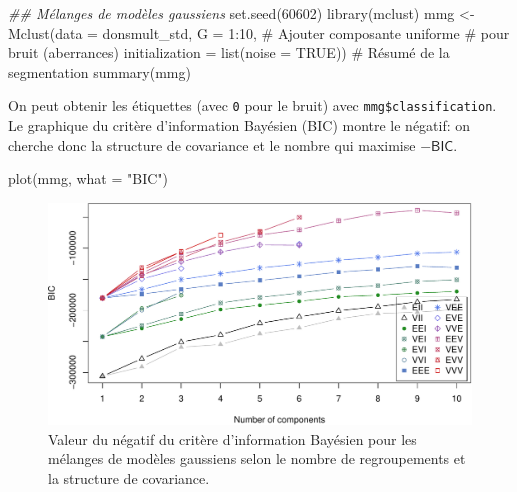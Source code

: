 \documentclass[
  11pt,
  letterpaper,
]{scrbook}
\newenvironment{Shaded}{\begin{snugshade}}{\end{snugshade}}
\newcommand{\AttributeTok}[1]{\textcolor[rgb]{0.40,0.45,0.13}{#1}}
\newcommand{\CommentTok}[1]{\textcolor[rgb]{0.37,0.37,0.37}{#1}}
\newcommand{\ConstantTok}[1]{\textcolor[rgb]{0.56,0.35,0.01}{#1}}
\newcommand{\DecValTok}[1]{\textcolor[rgb]{0.68,0.00,0.00}{#1}}
\newcommand{\DocumentationTok}[1]{\textcolor[rgb]{0.37,0.37,0.37}{\textit{#1}}}
\newcommand{\FunctionTok}[1]{\textcolor[rgb]{0.28,0.35,0.67}{#1}}
\newcommand{\NormalTok}[1]{\textcolor[rgb]{0.00,0.23,0.31}{#1}}
\newcommand{\OtherTok}[1]{\textcolor[rgb]{0.00,0.23,0.31}{#1}}
\newcommand{\SpecialCharTok}[1]{\textcolor[rgb]{0.37,0.37,0.37}{#1}}
\newcommand{\StringTok}[1]{\textcolor[rgb]{0.13,0.47,0.30}{#1}}
\theoremstyle{definition}
\theoremstyle{remark}
\begin{document}
\begin{Shaded}
\begin{Highlighting}[]
\DocumentationTok{\#\# Mélanges de modèles gaussiens}
\FunctionTok{set.seed}\NormalTok{(}\DecValTok{60602}\NormalTok{)}
\FunctionTok{library}\NormalTok{(mclust)}
\NormalTok{mmg }\OtherTok{\textless{}{-}} \FunctionTok{Mclust}\NormalTok{(}\AttributeTok{data =}\NormalTok{ donsmult\_std,}
       \AttributeTok{G =} \DecValTok{1}\SpecialCharTok{:}\DecValTok{10}\NormalTok{,}
       \CommentTok{\# Ajouter composante uniforme}
       \CommentTok{\#  pour bruit (aberrances)}
       \AttributeTok{initialization =} \FunctionTok{list}\NormalTok{(}\AttributeTok{noise =} \ConstantTok{TRUE}\NormalTok{))}
\CommentTok{\# Résumé de la segmentation}
\FunctionTok{summary}\NormalTok{(mmg)}
\end{Highlighting}
\end{Shaded}

On peut obtenir les étiquettes (avec \texttt{0} pour le bruit) avec
\texttt{mmg\$classification}. Le graphique du critère d'information
Bayésien (BIC) montre le négatif: on cherche donc la structure de
covariance et le nombre qui maximise \(-\mathsf{BIC}\).

\begin{Shaded}
\begin{Highlighting}[]
\FunctionTok{plot}\NormalTok{(mmg, }\AttributeTok{what =} \StringTok{"BIC"}\NormalTok{)}
\end{Highlighting}
\end{Shaded}

\begin{figure}[ht!]

{\centering \includegraphics[width=1\textwidth,height=\textheight]{./03-regroupements_files/figure-pdf/fig-mclustbic-1.pdf}

}

\caption{\label{fig-mclustbic}Valeur du négatif du critère d'information
Bayésien pour les mélanges de modèles gaussiens selon le nombre de
regroupements et la structure de covariance.}

\end{figure}
\end{document}
